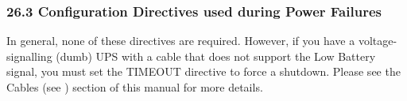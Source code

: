\label{Configuration-Directives-used-during-Power-Failures}

\subsubsection*{26.3 Configuration Directives used during Power Failures}

\label{index-Directives_002c-Power-fail-243}
\label{index-Power-fail-directives-244}
In general, none of these directives are required. However, if you have a
voltage-signalling (dumb) UPS with a cable that does not support the Low
Battery signal, you must set the TIMEOUT directive to force a shutdown. Please
see the Cables (see 
) section of this manual for more details.  

